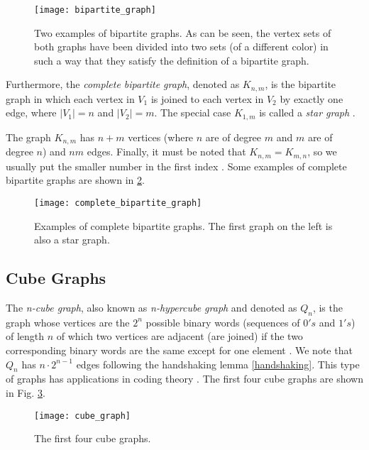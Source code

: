 \begin{figure}
	\centering
		\texttt{[image: bipartite\_graph]}
	\caption[Two examples of bipartite graphs.]{Two examples of bipartite graphs. As can be seen, the vertex sets of both graphs have been divided into two sets (of a different color) in such a way that they satisfy the definition of a bipartite graph.}
	\label{fig:bipartite_graph}
\end{figure}

Furthermore, the \textit{complete bipartite graph}, denoted as $K_{n,m}$, is the bipartite graph in which each vertex in $V_{1}$ is joined to each vertex in $V_{2}$ by exactly one edge, where $|V_{1}|=n$ and $|V_{2}|=m$. The special case $K_{1,m}$ is called a \textit{star graph} \cite{diestel}.

The graph $K_{n,m}$ has $n+m$ vertices (where $n$ are of degree $m$ and $m$ are of degree $n$) and $nm$ edges. Finally, it must be noted that $K_{n,m}=K_{m,n}$, so we usually put the smaller number in the first index \cite{wilsonwatkins}. Some examples of complete bipartite graphs are shown in \ref{fig:complete_bipartite_graph}.

\begin{figure}
	\centering
		\texttt{[image: complete\_bipartite\_graph]}
	\caption[Examples of complete bipartite graphs.]{Examples of complete bipartite graphs. The first graph on the left is also a star graph.}
	\label{fig:complete_bipartite_graph}
\end{figure}

\subsection{Cube Graphs}
The \textit{n-cube graph}, also known as \textit{n-hypercube graph} and denoted as $Q_{n}$, is the graph whose vertices are the $2^{n}$ possible binary words (sequences of $0's$ and $1's$) of length $n$ of which two vertices are adjacent (are joined) if the two corresponding binary words are the same except for one element \cite{hypercube}.
We note that $Q_{n}$ has $n \cdot 2^{n-1}$ edges following the handshaking lemma \ref{handshaking}.
This type of graphs has applications in coding theory \cite{wilsonwatkins}.
The first four cube graphs are shown in Fig. \ref{fig:cube_graph}.

\begin{figure}
	\centering
		\texttt{[image: cube\_graph]}
	\caption{The first four cube graphs.}
	\label{fig:cube_graph}
\end{figure}

